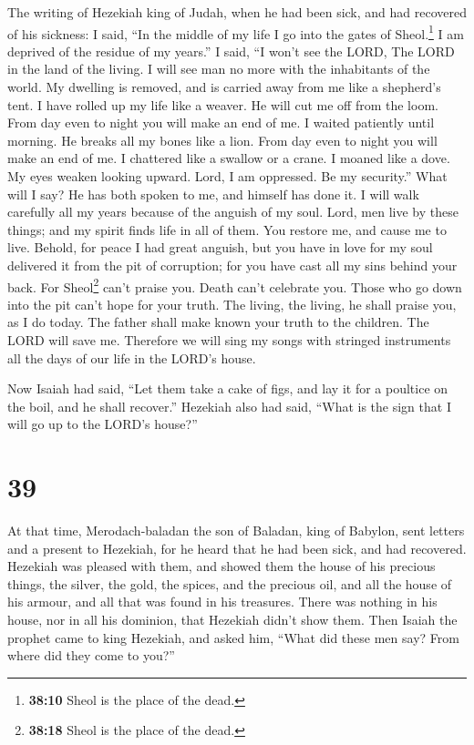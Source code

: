  The writing of Hezekiah king of Judah, when he had been
sick, and had recovered of his sickness:  I said, ``In
the middle of my life I go into the gates of Sheol.\footnote{\textbf{38:10}
  Sheol is the place of the dead.} I am deprived of the residue of my
years.''  I said, ``I won't see the LORD, The LORD in the
land of the living. I will see man no more with the inhabitants of the
world.  My dwelling is removed, and is carried away from
me like a shepherd's tent. I have rolled up my life like a weaver. He
will cut me off from the loom. From day even to night you will make an
end of me.  I waited patiently until morning. He breaks
all my bones like a lion. From day even to night you will make an end of
me.  I chattered like a swallow or a crane. I moaned like
a dove. My eyes weaken looking upward. Lord, I am oppressed. Be my
security.''  What will I say? He has both spoken to me,
and himself has done it. I will walk carefully all my years because of
the anguish of my soul.  Lord, men live by these things;
and my spirit finds life in all of them. You restore me, and cause me to
live.  Behold, for peace I had great anguish, but you
have in love for my soul delivered it from the pit of corruption; for
you have cast all my sins behind your back.  For
Sheol\footnote{\textbf{38:18} Sheol is the place of the dead.} can't
praise you. Death can't celebrate you. Those who go down into the pit
can't hope for your truth.  The living, the living, he
shall praise you, as I do today. The father shall make known your truth
to the children.  The LORD will save me. Therefore we
will sing my songs with stringed instruments all the days of our life in
the LORD's house.

 Now Isaiah had said, ``Let them take a cake of figs, and
lay it for a poultice on the boil, and he shall recover.''
 Hezekiah also had said, ``What is the sign that I will
go up to the LORD's house?''

\hypertarget{section-38}{%
\section{39}\label{section-38}}

 At that time, Merodach-baladan the son of Baladan, king
of Babylon, sent letters and a present to Hezekiah, for he heard that he
had been sick, and had recovered.  Hezekiah was pleased
with them, and showed them the house of his precious things, the silver,
the gold, the spices, and the precious oil, and all the house of his
armour, and all that was found in his treasures. There was nothing in
his house, nor in all his dominion, that Hezekiah didn't show them.
 Then Isaiah the prophet came to king Hezekiah, and asked
him, ``What did these men say? From where did they come to you?''

